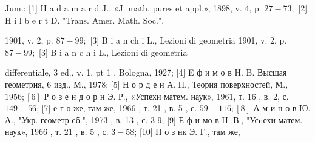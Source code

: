 \documentclass[10pt]{article}
\begin{document}
Jum.: [1] H a d a m a r d J., «J. math. pures et appl.», 1898, v. 4, p. $27-73 ;$ [2] H i l b e r t D. "Trans. Amer. Math. Soc.",

1901, v. 2, p. $87-99 ;$ [3] B i a n ch i L., Lezioni di geometria 1901, v. 2, p. $87-99 ;$ [3] B i a n c h i L., Lezioni di geometria

differentiale, 3 ed., v. 1, pt 1 , Bologna, 1927; [4] E ф и м о в H. B. Высшая геометрия, 6 изд., М., 1978; [5] Н о р д е н А. П., Теория поверхностей, М., $1956 ;[6]$ Р о з е н д о р н Э. Р., «Успехи матем. наук», 1961, т. 16 , в. 2, с. $149-56$; [7] е г о же, там же, 1966 , т. 21 , в. 5 , с. $59-116 ;[8]$ А м и н о в Ю. А., "Укр. геометр сб.", 1973 , в. 13 , с. 3-9; [9] Е ф и мо в Н. В., "Усnехи матем. наук», 1966 , т. 21 , в. 5 , с. $3-58$; [10] П о з нк Э. Г., там же,
\end{document}

